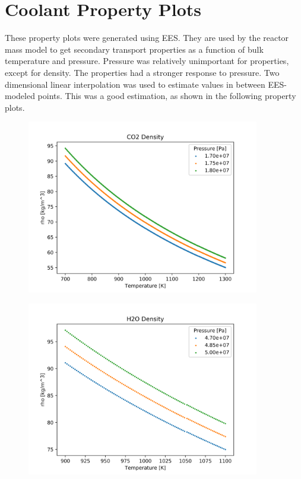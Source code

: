 \chapter{Coolant Property Plots}\label{ch:appendix-a}

These property plots were generated using EES. They are used by the reactor mass
model to get secondary transport properties as a function of bulk temperature
and pressure. Pressure was relatively unimportant for \codiox properties,
except for density. The \water properties had a stronger response to pressure.
Two dimensional linear interpolation was used to estimate values in between
EES-modeled points. This was a good estimation, as shown in the following
property plots.

\begin{figure}[h]
    \centering
    \includegraphics[width=4in]{../images/property_plots/CO2_Density.png}
\end{figure}

\begin{figure}[h]
    \centering
    \includegraphics[width=4in]{../images/property_plots/H2O_Density.png}
\end{figure}

